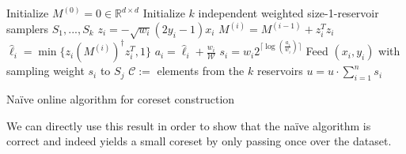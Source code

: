 \begin{algorithm}
    \DontPrintSemicolon
    Initialize $M^{(0)} = 0 \in \mathbb{R}^{d \times d}$ \;
    Initialize $k$ independent weighted size-1-reservoir
    samplers $S_1, ..., S_k$ \;
     {
        $z_i = -\sqrt{w_i} (2y_i - 1)x_i$
        $M^{(i)} = M^{(i-1)} + z_i^T z_i$
        $\hat{\ell}_i = \min\{z_i (M^{(i)})^\dagger z_i^T, 1\}$
        $a_i = \hat{\ell}_i + \frac{w_i}{\mathcal{W}}$
        $s_i = w_i 2^{\lceil\log(\frac{a_i}{w_i})\rceil}$
         {
            Feed $(x_i, y_i)$ with sampling weight $s_i$ to $S_j$ \;
        }
    }
    $\mathcal{C} := $ elements from the $k$ reservoirs \;
    $u = u \cdot \sum_{i=1}^n s_i$
    \caption{Na\"ive online algorithm for coreset construction\label{algo:online-naive}}
\end{algorithm}

We can directly use this result in order to show that the na\"ive
algorithm is correct and indeed yields a small coreset by
only passing once over the dataset.

